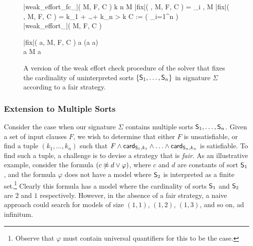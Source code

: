 \documentclass{svjour3}                     %
\begin{document}
\begin{figure}[t]
\begin{minipage}[t]{.4\linewidth}
\begin{program}
\PROC |weak\_effort\_fc\_\fcc|( M, F, C ) \BODY   
   k \geq n  \neg \card[\Sigma,k] \not\in M
  \IF |fix|( \card[\Sigma,k], M, F, C ) = 
     
  \FI 
   \So_i \in \Sigma,  \neg \card[\So_i,k_i] \not\in M 
  \IF |fix|( \card[\So_i,k_i], M, F, C ) =  
     
  \FI 
  \IF k_1 + \ldots + k_n > k
     C := ( \displaystyle\vee_{i=1}^n \card[\So_i, k_i-1] \vee \neg \card[\Sigma, k] ) \\
     
  \FI
   |weak\_effort\_\fcc|( M, F, C )
\ENDPROC
\end{program}
\end{minipage}
\begin{minipage}[t]{.4\linewidth}
\begin{program}
\PROC |fix|( a, M, F, C ) \BODY 
    \IF a \not\in {}
       (a \vee \neg a) \\
       
    \ELSEIF a \not\in M
       a \\
       
    \ELSE
       
\end{program}
\end{minipage}

\caption{A version of the weak effort check procedure of the \fcc solver
that fixes the cardinality of uninterpreted sorts $\{ \So_1, \ldots, \So_n \}$ in signature $\Sigma$
according to a fair strategy.
}
\label{fig:weak-effort-fix-card-ms}
\end{figure}

\subsubsection*{Extension to Multiple Sorts}

Consider the case when our signature $\Sigma$ contains multiple sorts $\So_1, \ldots, \So_n$.
Given a set of input clauses $F$, we wish to determine that either $F$ is unsatisfiable, 
or find a tuple $( k_1, \ldots, k_n )$ such that $F \wedge \card[\So_1, k_1] \wedge \ldots \wedge \card[\So_n, k_n]$ is satisfiable.
To find such a tuple, a challenge is to devise a strategy that is \emph{fair}.
As an illustrative example, consider the formula $( c \tneq d \vee \varphi )$, 
where $c$ and $d$ are constants of sort $\So_1$, and the formula $\varphi$ does not have a model where $\So_2$ is interpreted as a finite set.\footnote{%
Observe that $\varphi$ must contain universal quantifiers for this to be the case.
}
Clearly this formula has a model where the cardinality of sorts $\So_1$ and $\So_2$ are $2$ and $1$ respectively.
However, in the absence of a fair strategy, 
a naive approach could search for models of size $( 1, 1 )$, $( 1, 2 )$, $( 1, 3 )$, and so on, ad infinitum.
\end{document}
